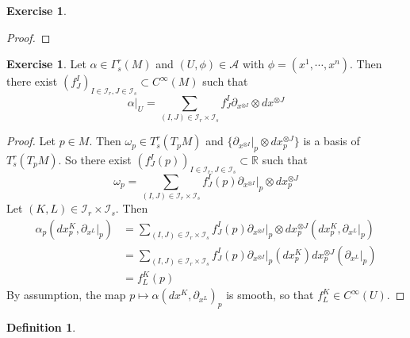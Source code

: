 \documentclass{book}
\theoremstyle{definition}
\newtheorem{defn}[definition]{Definition}
\newtheorem{ex}[definition]{Exercise}
\newcommand{\al}{\alpha}
\newcommand{\om}{\omega}
\newcommand{\Gam}{\Gamma}
\newcommand{\R}{\mathbb{R}}
\newcommand{\MA}{\mathcal{A}}
\newcommand{\MI}{\mathcal{I}}
\DeclareMathOperator*{\0}{\mbf{0}}
\DeclareMathOperator*{\1}{\mbf{1}}
\begin{document}
	
	\begin{ex}
	
	\end{ex}
	
	\begin{proof}
	
	\end{proof}
	
	\begin{ex}
		Let $\al \in \Gam^r_s(M)$ and $(U, \phi) \in \MA$ with $\phi = (x^1, \cdots, x^n)$. Then there exist $(f^I_J)_{I \in \MI_r, J \in \MI_s} \subset C^{\infty}(M)$ such that $$\al|_U = \sum_{(I,J) \in \MI_r \times \MI_s} f^I_J \partial_{x^{\otimes I}} \otimes dx^{\otimes J}$$ 
	\end{ex}

	\begin{proof}
		Let $p \in M$. Then $\om_p \in T^r_s(T_pM)$ and $\bigg \{\partial_{x^{\otimes I}}|_p \otimes dx^{\otimes J}_p \bigg \}$ is a basis of $T^r_s(T_pM)$. So there exist $(f^I_J(p))_{I \in \MI_r, J \in \MI_s } \subset \R$ such that $$\om_p = \sum\limits_{(I,J) \in \MI_r \times \MI_s } f^I_J(p) \partial_{x^{\otimes I}}|_p \otimes dx^{\otimes J}_p $$
		Let $(K,L) \in \MI_r \times \MI_s$. Then 
		\begin{align*}
		\al_p(dx^K_p, \partial_{x^L}|_p) 
		&=  \sum\limits_{(I,J) \in \MI_r \times \MI_s } f^I_J(p) \partial_{x^{\otimes I}}|_p \otimes dx^{\otimes J}_p(dx^K_p, \partial_{x^L}|_p) \\
		&= \sum\limits_{(I,J) \in \MI_r \times \MI_s } f^I_J(p) \partial_{x^{\otimes I}}|_p (dx^K_p) dx^{\otimes J}_p(\partial_{x^L}|_p)  \\
		&= f^K_L(p)
		\end{align*}
		By assumption, the map $p \mapsto \al(dx^K, \partial_{x^L})_p$ is smooth, so that $f^K_L \in C^{\infty}(U)$.
	
	\end{proof}
	
	\begin{defn}
	
	\end{defn}	
	
	
	
	
	
	
	
	
	
	
	
	
	
	
	
	
	
	
	
	
	
\end{document}

